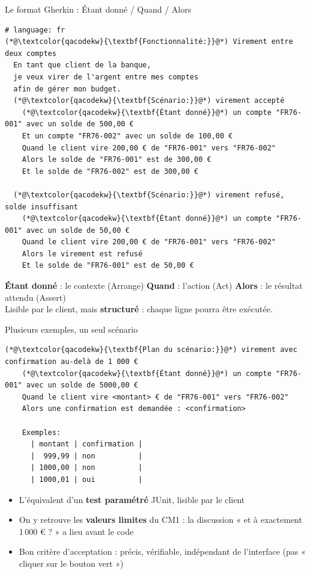 \documentclass[aspectratio=169,10pt]{beamer}
\begin{document}
\begin{frame}[fragile]{Le format Gherkin : Étant donné / Quand / Alors}
\begin{lstlisting}[style=gherkin]
# language: fr
(*@\textcolor{qacodekw}{\textbf{Fonctionnalité:}}@*) Virement entre deux comptes
  En tant que client de la banque,
  je veux virer de l'argent entre mes comptes
  afin de gérer mon budget.
  (*@\textcolor{qacodekw}{\textbf{Scénario:}}@*) virement accepté
    (*@\textcolor{qacodekw}{\textbf{Étant donné}}@*) un compte "FR76-001" avec un solde de 500,00 €
    Et un compte "FR76-002" avec un solde de 100,00 €
    Quand le client vire 200,00 € de "FR76-001" vers "FR76-002"
    Alors le solde de "FR76-001" est de 300,00 €
    Et le solde de "FR76-002" est de 300,00 €

  (*@\textcolor{qacodekw}{\textbf{Scénario:}}@*) virement refusé, solde insuffisant
    (*@\textcolor{qacodekw}{\textbf{Étant donné}}@*) un compte "FR76-001" avec un solde de 50,00 €
    Quand le client vire 200,00 € de "FR76-001" vers "FR76-002"
    Alors le virement est refusé
    Et le solde de "FR76-001" est de 50,00 €
\end{lstlisting}
  \small
  \textbf{Étant donné} : le contexte (Arrange) \quad
  \textbf{Quand} : l'action (Act) \quad
  \textbf{Alors} : le résultat attendu (Assert) \\[1mm]
  Lisible par le client, mais \textbf{structuré} : chaque ligne pourra être exécutée.
\end{frame}

\begin{frame}[fragile]{Plusieurs exemples, un seul scénario}
\begin{lstlisting}[style=gherkin]
  (*@\textcolor{qacodekw}{\textbf{Plan du scénario:}}@*) virement avec confirmation au-delà de 1 000 €
    (*@\textcolor{qacodekw}{\textbf{Étant donné}}@*) un compte "FR76-001" avec un solde de 5000,00 €
    Quand le client vire <montant> € de "FR76-001" vers "FR76-002"
    Alors une confirmation est demandée : <confirmation>

    Exemples:
      | montant | confirmation |
      |  999,99 | non          |
      | 1000,00 | non          |
      | 1000,01 | oui          |
\end{lstlisting}
  \begin{itemize}
    \item L'équivalent d'un \textbf{test paramétré} JUnit, lisible par le client
    \item On y retrouve les \textbf{valeurs limites} du CM1 : la discussion « et à exactement 1\,000 \euro{} ? » a lieu \alert{avant} le code
    \item Bon critère d'acceptation : précis, vérifiable, indépendant de l'interface (pas « cliquer sur le bouton vert »)
  \end{itemize}
\end{frame}
\end{document}
